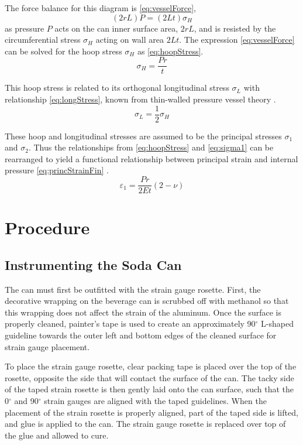 \documentclass[10pt,journal,letterpaper]{IEEEtran}
\begin{document}
The force balance for this diagram is \eqref{eq:vesselForce},
\begin{equation}
\label{eq:vesselForce}
(2rL)P=(2Lt)\sigma_H
\end{equation}
as pressure $P$ acts on the can inner surface area, $2rL$, and is resisted by the circumferential stress $\sigma_H$ acting on wall area $2Lt$.
The expression \eqref{eq:vesselForce} can be solved for the hoop stress $\sigma_H$ as \eqref{eq:hoopStress}.
\begin{equation}
\label{eq:hoopStress}
\sigma_H=\frac{Pr}{t}
\end{equation}

This hoop stress is related to its orthogonal longitudinal stress $\sigma_L$ with relationship \eqref{eq:longStress}, known from thin-walled pressure vessel theory \cite{b1}.
\begin{equation}
\label{eq:longStress}
\sigma_L=\frac{1}{2}\sigma_H
\end{equation}

These hoop and longitudinal stresses are assumed to be the principal stresses $\sigma_1$ and $\sigma_2$.
Thus the relationships from \eqref{eq:hoopStress} and \eqref{eq:sigma1} can be rearranged to yield a functional relationship between principal strain and internal pressure \eqref{eq:princStrainFin} \cite{b1}.
\begin{equation}
\label{eq:princStrainFin}
\varepsilon_1=\frac{Pr}{2Et}(2-\nu)
\end{equation}

\section{Procedure}

\subsection{Instrumenting the Soda Can}

The can must first be outfitted with the strain  gauge rosette.
First, the decorative wrapping on the beverage can is scrubbed off with methanol so that this wrapping does not affect the strain of the aluminum.
Once the surface is properly cleaned, painter's tape is used to create an approximately 90$^\circ$ L-shaped guideline towards the outer left and bottom edges of the cleaned surface for strain gauge placement.

To place the strain gauge rosette, clear packing tape is placed over the top of the rosette, opposite the side that will contact the surface of the can.
The tacky side of the taped strain rosette is then gently laid onto the can surface, such that the 0$^\circ$ and 90$^\circ$ strain gauges are aligned with the taped guidelines.
When the placement of the strain rosette is properly aligned, part of the taped side is lifted, and glue is applied to the can.
The strain gauge rosette is replaced over top of the glue and allowed to cure.
\end{document}
